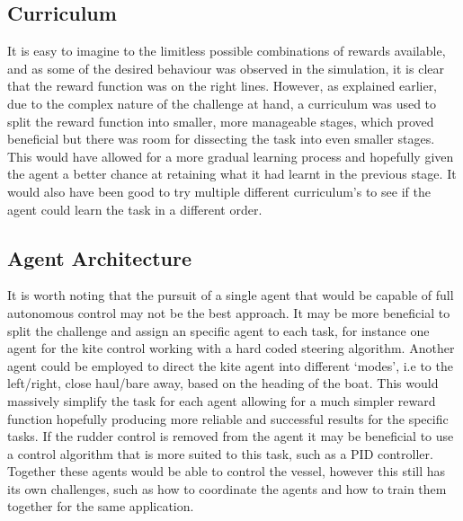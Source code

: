 \subsection*{Curriculum}

It is easy to imagine to the limitless possible combinations of rewards available, and as some of the desired behaviour was observed in the simulation, it is clear that the reward function was on the right lines. However, as explained earlier, due to the complex nature of the challenge at hand, a curriculum was used to split the reward function into smaller, more manageable stages, which proved beneficial but there was room for dissecting the task into even smaller stages. This would have allowed for a more gradual learning process and hopefully given the agent a better chance at retaining what it had learnt in the previous stage. It would also have been good to try multiple different curriculum's to see if the agent could learn the task in a different order.

\subsection*{Agent Architecture}
It is worth noting that the pursuit of a single agent that would be capable of full autonomous control may not be the best approach. It may be more beneficial to split the challenge and assign an specific agent to each task, for instance one agent for the kite control working with a hard coded steering algorithm. Another agent could be employed to direct the kite agent into different `modes', i.e to the left/right, close haul/bare away, based on the heading of the boat. This would massively simplify the task for each agent allowing for a much simpler reward function hopefully producing more reliable and successful results for the specific tasks. If the rudder control is removed from the agent it may be beneficial to use a control algorithm that is more suited to this task, such as a PID controller. Together these agents would be able to control the vessel, however this still has its own challenges, such as how to coordinate the agents and how to train them together for the same application. 


